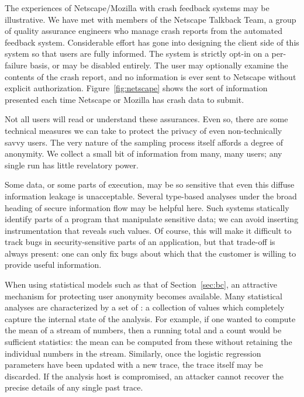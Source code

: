 The experiences of Netscape/Mozilla with crash feedback systems may be
illustrative.  We have met with members of the Netscape Talkback Team,
a group of quality assurance engineers who manage crash reports from
the automated feedback system.  Considerable effort has gone into
designing the client side of this system so that users are fully
informed.  The system is strictly opt-in on a per-failure basis, or
may be disabled entirely.  The user may optionally examine the
contents of the crash report, and no information is ever sent to
Netscape without explicit authorization.  Figure~\ref{fig:netscape}
shows the sort of information presented each time Netscape or Mozilla
has crash data to submit.

Not all users will read or understand these assurances.
  Even so, there are some technical
measures we can take to protect the privacy of even non-technically
savvy users.  The very nature of the sampling process itself affords a
degree of anonymity.  We collect a small bit of information from many,
many users; any single run has little revelatory power. 

Some data, or some parts of execution, may be so sensitive that even
this diffuse information leakage is unacceptable.  Several type-based
analyses under the broad heading of secure information flow
\cite{Broadwell:2003:SSGSCI,1997:tapsoft:volpano,ZdZhNyMy2001} may be
helpful here.  Such systems statically identify parts of a program
that manipulate sensitive data; we can avoid inserting instrumentation
that reveals such values.  Of course, this will make it difficult to
track bugs in security-sensitive parts of an application, but that
trade-off is always present: one can only fix bugs about which that
the customer is willing to provide useful information.  

When using statistical models such as that of Section~\ref{sec:bc}, an
attractive mechanism for protecting user anonymity becomes available.
Many statistical analyses are characterized by a set of
: a collection of values which
completely capture the internal state of the analysis.  For example,
if one wanted to compute the mean of a stream of numbers, then a
running total and a count would be sufficient statistics: the mean can
be computed from these without retaining the individual numbers in the
stream.  Similarly, once the logistic regression parameters have been
updated with a new trace, the trace itself may be discarded.  If the
analysis host is compromised, an attacker cannot recover the precise
details of any single past trace.

